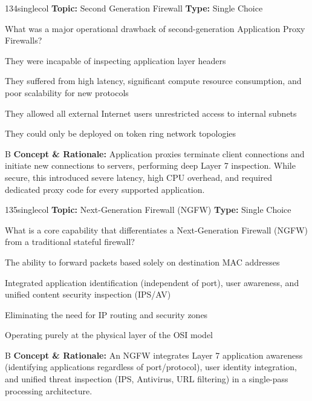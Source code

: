 \begin{qcard}{134}{singlecol}
\textcolor{darkslate!75}{\small\textbf{Topic:} Second Generation Firewall \hfill \textbf{Type:} Single Choice}\vspace{0.4em}\par
What was a major operational drawback of second-generation Application Proxy Firewalls?
\begin{qoptions}
\item They were incapable of inspecting application layer headers
\item They suffered from high latency, significant compute resource consumption, and poor scalability for new protocols
\item They allowed all external Internet users unrestricted access to internal subnets
\item They could only be deployed on token ring network topologies
\end{qoptions}
\end{qcard}
\nopagebreak
\begin{explainbox}{B}
\textbf{Concept \& Rationale:} Application proxies terminate client connections and initiate new connections to servers, performing deep Layer 7 inspection. While secure, this introduced severe latency, high CPU overhead, and required dedicated proxy code for every supported application.
\end{explainbox}

\begin{qcard}{135}{singlecol}
\textcolor{darkslate!75}{\small\textbf{Topic:} Next-Generation Firewall (NGFW) \hfill \textbf{Type:} Single Choice}\vspace{0.4em}\par
What is a core capability that differentiates a Next-Generation Firewall (NGFW) from a traditional stateful firewall?
\begin{qoptions}
\item The ability to forward packets based solely on destination MAC addresses
\item Integrated application identification (independent of port), user awareness, and unified content security inspection (IPS/AV)
\item Eliminating the need for IP routing and security zones
\item Operating purely at the physical layer of the OSI model
\end{qoptions}
\end{qcard}
\nopagebreak
\begin{explainbox}{B}
\textbf{Concept \& Rationale:} An NGFW integrates Layer 7 application awareness (identifying applications regardless of port/protocol), user identity integration, and unified threat inspection (IPS, Antivirus, URL filtering) in a single-pass processing architecture.
\end{explainbox}

